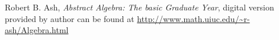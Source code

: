 \documentclass[8pt]{article} %
\begin{document}
\begin{thebibliography}{9}
	 Robert B. Ash, {\em Abstract Algebra: The basic Graduate Year}, digital version provided by author can be found at
		\url{http://www.math.uiuc.edu/~r-ash/Algebra.html}
\end{thebibliography}
\end{document}

